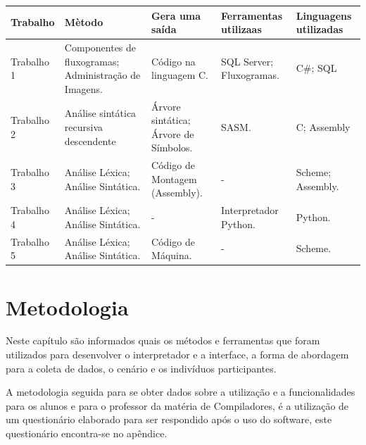 \documentclass[12pt,oneside,a4paper,chapter=TITLE,section=TITLE,sumario=tradicional]{abntex2}
\begin{document}
\begin{quadro}[htb]
    \centering
    \vspace{0.5cm}
    \begin{tabular}{|p{3.0cm}|p{3.0cm}|p{3.0cm}|p{3.0cm}|p{3.0cm}|}
        \hline
        \textbf{Trabalho} & \textbf{Mètodo} & \textbf{Gera uma saída} & \textbf{Ferramentas utilizaas} & \textbf{Linguagens utilizadas} \\ 
        \hline\hline
        Trabalho 1 & Componentes de fluxogramas; Administração de Imagens. & Código na linguagem C.   &  SQL Server; Fluxogramas. & C\#; SQL    \\ \hline 
        Trabalho 2 & Análise sintática recursiva descendente    & Árvore sintática; Árvore de Símbolos.   & SASM.  & C; Assembly  \\ \hline
        Trabalho 3 & Análise Léxica;  Análise Sintática.   & Código de Montagem (Assembly).  &  -  & Scheme; Assembly.  \\ \hline
        Trabalho 4 & Análise Léxica;  Análise Sintática.   & -   &  Interpretador Python.  & Python.   \\ \hline
        Trabalho 5 & Análise Léxica;  Análise Sintática.   &  Código de Máquina.   & -   & Scheme.   \\ \hline
    \end{tabular}

    
\end{quadro}



\chapter{Metodologia}
\label{cap:metodologia}

Neste capítulo são informados quais os métodos e ferramentas que foram utilizados para desenvolver o interpretador e a interface, a forma de abordagem para a coleta de dados, o cenário e os indivíduos participantes.

A metodologia seguida para se obter dados sobre a utilização e a funcionalidades para os alunos e para o professor da matéria de Compiladores, é a utilização de um questionário elaborado para ser respondido após o uso do software, este questionário encontra-se no apêndice.
\end{document}
